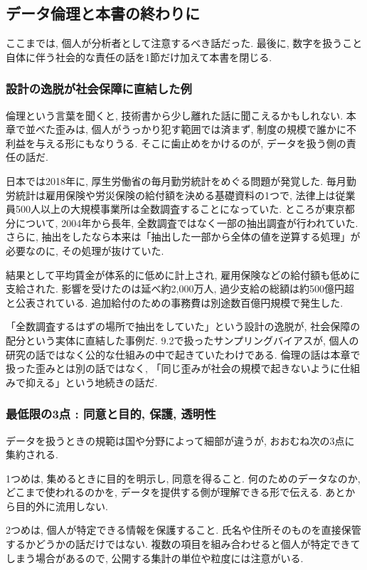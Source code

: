 \subsection{データ倫理と本書の終わりに}

ここまでは, 個人が分析者として注意するべき話だった.
最後に, 数字を扱うこと自体に伴う社会的な責任の話を1節だけ加えて本書を閉じる.

\subsubsection*{設計の逸脱が社会保障に直結した例}

倫理という言葉を聞くと, 技術書から少し離れた話に聞こえるかもしれない.
本章で並べた歪みは, 個人がうっかり犯す範囲では済まず, 制度の規模で誰かに不利益を与える形にもなりうる.
そこに歯止めをかけるのが, データを扱う側の責任の話だ.

日本では2018年に, 厚生労働省の毎月勤労統計をめぐる問題が発覚した.
毎月勤労統計は雇用保険や労災保険の給付額を決める基礎資料の1つで, 法律上は従業員500人以上の大規模事業所は全数調査することになっていた.
ところが東京都分について, 2004年から長年, 全数調査ではなく一部の抽出調査が行われていた.
さらに, 抽出をしたなら本来は「抽出した一部から全体の値を逆算する処理」が必要なのに, その処理が抜けていた.

結果として平均賃金が体系的に低めに計上され, 雇用保険などの給付額も低めに支給された.
影響を受けたのは延べ約2{,}000万人, 過少支給の総額は約500億円超と公表されている.
追加給付のための事務費は別途数百億円規模で発生した.

「全数調査するはずの場所で抽出をしていた」という設計の逸脱が, 社会保障の配分という実体に直結した事例だ.
9.2で扱ったサンプリングバイアスが, 個人の研究の話ではなく公的な仕組みの中で起きていたわけである.
倫理の話は本章で扱った歪みとは別の話ではなく, 「同じ歪みが社会の規模で起きないように仕組みで抑える」という地続きの話だ.

\subsubsection*{最低限の3点 : 同意と目的, 保護, 透明性}

データを扱うときの規範は国や分野によって細部が違うが, おおむね次の3点に集約される.

1つめは, 集めるときに目的を明示し, 同意を得ること.
何のためのデータなのか, どこまで使われるのかを, データを提供する側が理解できる形で伝える.
あとから目的外に流用しない.

2つめは, 個人が特定できる情報を保護すること.
氏名や住所そのものを直接保管するかどうかの話だけではない.
複数の項目を組み合わせると個人が特定できてしまう場合があるので, 公開する集計の単位や粒度には注意がいる.

